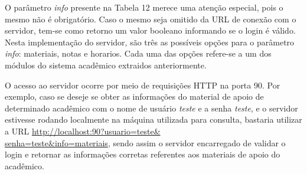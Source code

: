 O parâmetro \emph{info} presente na Tabela 12 merece uma atenção especial, pois o mesmo não é obrigatório. Caso o mesmo seja omitido da URL de conexão com o servidor, tem-se como retorno um valor booleano informando se o login é válido. Nesta implementação do servidor, são três as possíveis opções para o parâmetro \emph{info}: materiais, notas e horarios. Cada uma das opções refere-se a um dos módulos do sistema acadêmico extraidos anteriormente.

O acesso ao servidor ocorre por meio de requisições HTTP na porta 90. Por exemplo, caso se deseje se obter as informações do material de apoio de determinado acadêmico com o nome de usuário \emph{teste} e a senha \emph{teste}, e o servidor estivesse rodando localmente na máquina utilizada para consulta, bastaria utilizar a URL \url{http://localhost:90?usuario=teste&}\\ \url{senha=teste&info=materiais}, sendo assim o servidor encarregado de validar o login e retornar as informações corretas referentes aos materiais de apoio do acadêmico.